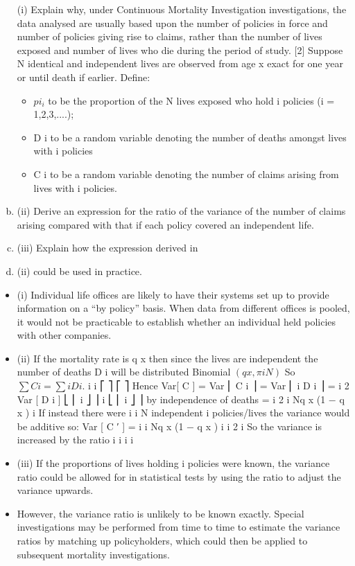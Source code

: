 \documentclass[a4paper,12pt]{article}
\begin{document}
\begin{enumerate}[(a)]
(i) Explain why, under Continuous Mortality Investigation investigations, the data analysed are usually based upon the number of policies in force and number of policies giving rise to claims, rather than the number of lives
exposed and number of lives who die during the period of study.
[2]
Suppose N identical and independent lives are observed from age x exact for one year
or until death if earlier.
\medskip
Define:
\begin{itemize}
\item $pi_i$ to be the proportion of the N lives exposed who hold i policies (i = 1,2,3,....);
\item D i to be a random variable denoting the number of deaths amongst lives with i
policies
\item C i to be a random variable denoting the number of claims arising from lives with i
policies.
\end{itemize}


\item (ii) Derive an expression for the ratio of the variance of the number of claims
arising compared with that if each policy covered an independent life.

\item (iii) Explain how the expression derived in \item (ii) could be used in practice.
\end{enumerate}


\begin{itemize}
\item (i)
Individual life offices are likely to have their systems set up to provide
information on a “by policy” basis.
When data from different offices is pooled, it would not be practicable to
establish whether an individual held policies with other companies.
\item (ii)
If the mortality rate is q x then since the lives are independent the number of
deaths D i will be distributed Binomial $( q x , \pi i N )$
So
$\sum C i = \sum i D i .$
i
i
⎡
⎤
⎡
⎤
Hence Var[ C ] = Var ⎢ \sum C i ⎥ = Var ⎢ \sum i D i ⎥ = \sum i 2 Var [ D i ]
⎣ ⎢ i
⎦ ⎥ i
⎣ ⎢ i
⎦ ⎥
by independence of deaths
= \sum i 2 \pi i Nq x (1 − q x )
i
If instead there were
\sum i \pi i N independent
i
policies/lives the variance would be additive so:
Var [ C ′ ] = \sum i \pi i Nq x (1 − q x )
i
\sum i 2 \pi i
So the variance is increased by the ratio i
\sum i \pi i
i
\item (iii)
If the proportions of lives holding i policies were known, the variance ratio
could be allowed for in statistical tests
by using the ratio to adjust the variance upwards.
\item However, the variance ratio is unlikely to be known exactly.
Special investigations may be performed from time to time to estimate the
variance ratios by matching up policyholders, which could then be applied to
subsequent mortality investigations.
\end{itemize}
\end{document}
